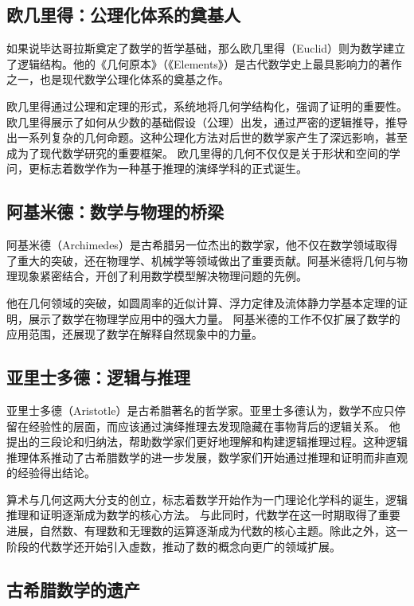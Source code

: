 \subsection{欧几里得：公理化体系的奠基人}
如果说毕达哥拉斯奠定了数学的哲学基础，那么欧几里得（Euclid）则为数学建立了逻辑结构。他的《几何原本》（《Elements》）是古代数学史上最具影响力的著作之一，也是现代数学公理化体系的奠基之作。

欧几里得通过公理和定理的形式，系统地将几何学结构化，强调了证明的重要性。欧几里得展示了如何从少数的基础假设（公理）出发，通过严密的逻辑推导，推导出一系列复杂的几何命题。这种公理化方法对后世的数学家产生了深远影响，甚至成为了现代数学研究的重要框架。
欧几里得的几何不仅仅是关于形状和空间的学问，更标志着数学作为一种基于推理的演绎学科的正式诞生。

\subsection{阿基米德：数学与物理的桥梁}
阿基米德（Archimedes）是古希腊另一位杰出的数学家，他不仅在数学领域取得了重大的突破，还在物理学、机械学等领域做出了重要贡献。阿基米德将几何与物理现象紧密结合，开创了利用数学模型解决物理问题的先例。

他在几何领域的突破，如圆周率的近似计算、浮力定律及流体静力学基本定理的证明，展示了数学在物理学应用中的强大力量。
阿基米德的工作不仅扩展了数学的应用范围，还展现了数学在解释自然现象中的力量。

\subsection{亚里士多德：逻辑与推理}

亚里士多德（Aristotle）是古希腊著名的哲学家。亚里士多德认为，数学不应只停留在经验性的层面，而应该通过演绎推理去发现隐藏在事物背后的逻辑关系。
他提出的三段论和归纳法，帮助数学家们更好地理解和构建逻辑推理过程。这种逻辑推理体系推动了古希腊数学的进一步发展，数学家们开始通过推理和证明而非直观的经验得出结论。


算术与几何这两大分支的创立，标志着数学开始作为一门理论化学科的诞生，逻辑推理和证明逐渐成为数学的核心方法。
与此同时，代数学在这一时期取得了重要进展，自然数、有理数和无理数的运算逐渐成为代数的核心主题。除此之外，这一阶段的代数学还开始引入虚数，推动了数的概念向更广的领域扩展。

\subsection{古希腊数学的遗产}

